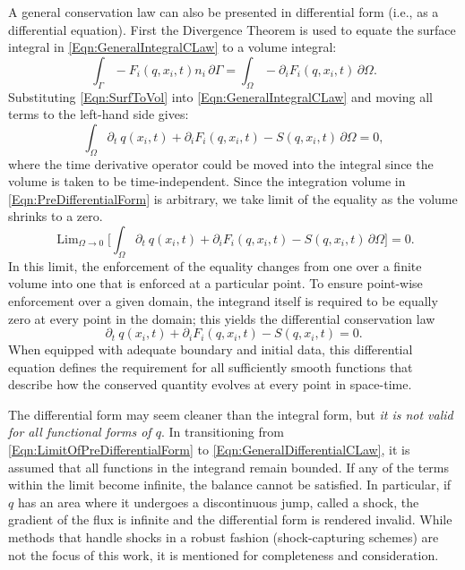 \documentclass[Prelim,12pt]{WisconsinThesis}
\newcommand{\pdt}   {\partial_t\:\!}
\newcommand{\pdi}   {\partial_i}
\newcommand{\V}     {\ensuremath{\Omega}}
\newcommand{\dV}    {\,\partial\V}
\newcommand{\IntV}  {\int_{\V}}
\renewcommand{\S}   {\ensuremath{\Gamma}}
\newcommand{\dS}    {\,\partial\S}
\newcommand{\IntS}  {\int_{\S}}
\newcommand{\q}     {\ensuremath{q}}
\DeclareMathOperator*{\Lim}{Lim}
\begin{document}
A general conservation law can also be presented in differential form (i.e., as a differential equation).
First the Divergence Theorem is used to equate the surface integral in \cref{Eqn:GeneralIntegralCLaw} to a volume integral:
\begin{equation}
    \IntS -F_i(\q,x_i,t) n_i\dS = \IntV - \pdi F_i(\q,x_i,t) \dV.
    \label{Eqn:SurfToVol}
\end{equation}
Substituting \cref{Eqn:SurfToVol} into \cref{Eqn:GeneralIntegralCLaw} and moving all terms to the left-hand side gives:
\begin{equation}%
    \IntV \pdt\q(x_i,t) + \pdi F_i(\q,x_i,t) - S(\q,x_i,t) \dV = 0,
    \label{Eqn:PreDifferentialForm}
\end{equation}
where the time derivative operator could be moved into the integral since the volume is taken to be time-independent.
Since the integration volume in \cref{Eqn:PreDifferentialForm} is arbitrary, we take limit of the equality as the volume shrinks to a zero.
\begin{equation}%
    \Lim_{\V \rightarrow 0}\Biggl[\IntV \pdt\q(x_i,t) + \pdi F_i(\q,x_i,t) - S(\q,x_i,t) \dV \Biggr]= 0.
    \label{Eqn:LimitOfPreDifferentialForm}
\end{equation}
In this limit, the enforcement of the equality changes from one over a finite volume into one that is enforced at a particular point.
To ensure point-wise enforcement over a given domain, the integrand itself is required to be equally zero at every point in the domain; this yields the differential conservation law
\begin{equation}
    \pdt\q(x_i,t) + \pdi F_i(\q,x_i,t) - S(\q,x_i,t) = 0.
    \label{Eqn:GeneralDifferentialCLaw}
\end{equation}
When equipped with adequate boundary and initial data, this differential equation defines the requirement for all sufficiently smooth functions that describe how the conserved quantity evolves at every point in space-time.

The differential form may seem cleaner than the integral form, but \emph{it is not valid for all functional forms of \q{}}.
In transitioning from \cref{Eqn:LimitOfPreDifferentialForm} to \cref{Eqn:GeneralDifferentialCLaw}, it is assumed that all functions in the integrand remain bounded.
If any of the terms within the limit become infinite, the balance cannot be satisfied.
In particular, if \q{} has an area where it undergoes a discontinuous jump, called a shock, the gradient of the flux is infinite and the differential form is rendered invalid.
While methods that handle shocks in a robust fashion (shock-capturing schemes) are not the focus of this work, it is mentioned for completeness and consideration.
\end{document}
